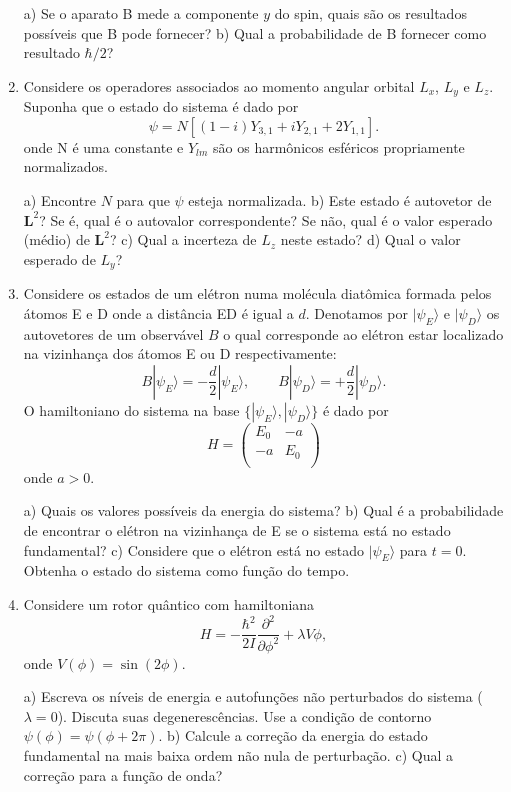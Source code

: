 \begin{enumerate}[start=1,label={\bfseries Q\arabic*.}]
a) Se o aparato B mede a componente $y$ do spin, quais são os resultados possíveis que B pode fornecer?
b) Qual a probabilidade de B fornecer como resultado $\hbar/2$?





\item Considere os operadores associados ao momento angular orbital $L_{x}$, $L_{y}$ e $L_{z}$. Suponha que o estado do sistema é dado por
$$
\psi = N \left[ (1-i)Y_{3,1} + iY_{2,1} + 2Y_{1,1}  \right].
$$
onde N é uma constante e $Y_{lm}$ são os harmônicos esféricos propriamente normalizados.

a) Encontre $N$ para que $\psi$ esteja normalizada.
b) Este estado é autovetor de $\mathbf{L}^{2}$? Se é, qual é o autovalor correspondente? Se não, qual é o valor esperado (médio) de $\mathbf{L}^{2}$?
c) Qual a incerteza de $L_{z}$ neste estado?
d) Qual o valor esperado de $L_{y}$?




\item Considere os estados de um elétron numa molécula diatômica formada pelos átomos E e D onde a distância ED é igual a $d$. Denotamos por $| \psi_{E} \rangle$ e $| \psi_{D} \rangle$ os autovetores de um observável $B$ o qual corresponde ao elétron estar localizado na vizinhança dos átomos E ou D respectivamente:
$$
 B | \psi_{E} \rangle = - \frac{d}{2} | \psi_{E} \rangle, \quad \quad B |\psi_{D}\rangle = + \frac{d}{2} | \psi_{D} \rangle .
$$
O hamiltoniano do sistema na base $\{ | \psi_{E} \rangle, | \psi_{D} \rangle \}$ é dado por
$$
H = \left(
      \begin{array}{cc}
        E_{0} & -a \\
        -a & E_{0} \\
      \end{array}
    \right)
$$
onde $a > 0$.

a) Quais os valores possíveis da energia do sistema?
b) Qual é a probabilidade de encontrar o elétron na vizinhança de E se o sistema está no estado fundamental?
c) Considere que o elétron está no estado $| \psi_{E} \rangle$ para $t = 0$. Obtenha o estado do sistema como função do tempo.




\item Considere um rotor quântico com hamiltoniana
$$
H = - \frac{\hbar^{2}}{2 I} \frac{\partial^{2}}{\partial \phi^{2}} + \lambda V \phi,
$$
onde $V (\phi) = \operatorname{sin}(2 \phi)$.

a) Escreva os níveis de energia e autofunções não perturbados do sistema ($\lambda = 0$). Discuta suas degenerescências. Use a condição de contorno $\psi(\phi) = \psi (\phi + 2 \pi)$.
b) Calcule a correção da energia do estado fundamental na mais baixa ordem não nula de perturbação.
c) Qual a correção para a função de onda?





\end{enumerate}
